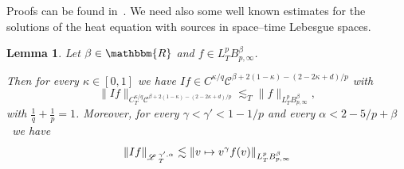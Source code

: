 \documentclass[a4paper,11pt]{article}
\newtheorem{lemma}[theorem]{Lemma}
{\theorembodyfont{\rmfamily}\newtheorem{remark}[theorem]{Remark}}
\newcommand{\LL}{\mathscr{L} \hspace{.2em}}
\begin{document}
Proofs can be found in~{\cite{gubinelli_kpz_2017}}. We need also some well
known estimates for the solutions of the heat equation with sources in
space--time Lebesgue spaces.

\begin{lemma}
  \label{l:lp-integ}
  Let $\beta \in \mathbbm{R}$ and $f \in L^p_T B^{\beta}_{p,
  \infty}$. 
  
  Then for every $\kappa \in [0, 1]$ we have $I f \in C^{\kappa / q}
  \mathcal{C}^{\beta + 2 (1 - \kappa) - (2 - 2 \kappa + d) / p}$ with
  \[ \|I f\|_{C_T^{\kappa / q}  \mathcal{C}^{\beta + 2 (1 - \kappa) - (2 - 2
     \kappa + d) / p}} \lesssim_T \|f\|_{L^p_T B^{\beta}_{p, \infty}}, \]
  with $\frac{1}{q} + \frac{1}{p} = 1$. Moreover, for every $\gamma < \gamma'
  < 1 - 1 / p$ and every $\alpha < 2 - 5 / p + \beta$ \ we have
  \[ \| I f \|_{\LL^{\gamma', \alpha}_T} \lesssim \| v \mapsto v^{\gamma} f
     (v) \|_{L^p_T B^{\beta}_{p, \infty}} \]
\end{lemma}
\end{document}
